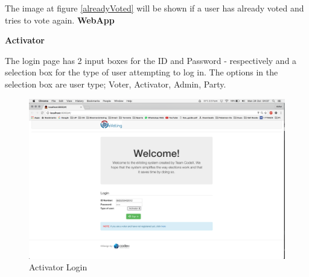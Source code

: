 \documentclass[11pt]{article}
\begin{document}
		The image at figure \ref{alreadyVoted} will be shown if a user has already voted and tries to vote again. \newline
		\newpage
		\textbf{WebApp}
		
		\textbf{Activator}
		
		The login page has 2 input boxes for the ID and Password - respectively and a selection box for the type of user attempting to log in. The options in the selection box are user type; Voter, Activator, Admin, Party.
		\begin{figure}[H]
			\centering
			\includegraphics[width=0.7\linewidth]{../Images/UserManual/activatorWeb/activatorlogin.png}
			\caption{Activator Login}
		\end{figure}
		
\end{document}
